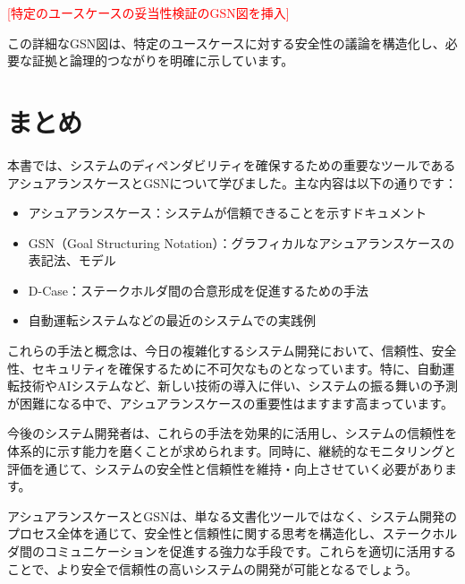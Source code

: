 \textcolor{red}{[特定のユースケースの妥当性検証のGSN図を挿入]}

この詳細なGSN図は、特定のユースケースに対する安全性の議論を構造化し、必要な証拠と論理的つながりを明確に示しています。

\section{まとめ}

本書では、システムのディペンダビリティを確保するための重要なツールであるアシュアランスケースとGSNについて学びました。主な内容は以下の通りです：

\begin{itemize}
    \item アシュアランスケース：システムが信頼できることを示すドキュメント
    \item GSN（Goal Structuring Notation）：グラフィカルなアシュアランスケースの表記法、モデル
    \item D-Case：ステークホルダ間の合意形成を促進するための手法
    \item 自動運転システムなどの最近のシステムでの実践例
\end{itemize}

これらの手法と概念は、今日の複雑化するシステム開発において、信頼性、安全性、セキュリティを確保するために不可欠なものとなっています。特に、自動運転技術やAIシステムなど、新しい技術の導入に伴い、システムの振る舞いの予測が困難になる中で、アシュアランスケースの重要性はますます高まっています。

今後のシステム開発者は、これらの手法を効果的に活用し、システムの信頼性を体系的に示す能力を磨くことが求められます。同時に、継続的なモニタリングと評価を通じて、システムの安全性と信頼性を維持・向上させていく必要があります。

アシュアランスケースとGSNは、単なる文書化ツールではなく、システム開発のプロセス全体を通じて、安全性と信頼性に関する思考を構造化し、ステークホルダ間のコミュニケーションを促進する強力な手段です。これらを適切に活用することで、より安全で信頼性の高いシステムの開発が可能となるでしょう。

